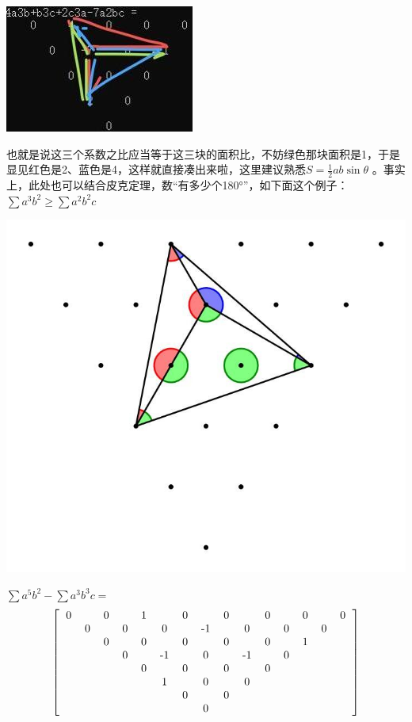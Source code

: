 \documentclass[UTF8]{ctexart}
\begin{document}
\begin{center}
	\includegraphics[width=0.4\linewidth]{130}
\end{center}

也就是说这三个系数之比应当等于这三块的面积比，不妨绿色那块面积是1，于是显见红色是2、蓝色是4，这样就直接凑出来啦，这里建议熟悉$ S=\displaystyle \frac{1}{2}ab  \sin \theta $
。事实上，此处也可以结合皮克定理，数“有多少个180°”，如下面这个例子：\\
$ \displaystyle  \sum a^{3} b^{2} \geq \displaystyle  \sum a^{2} b^{2} c $

\begin{center}
	\includegraphics[width=0.4\linewidth]{140}
\end{center}

$ \displaystyle  \sum a^{5}b^{2}-\displaystyle  \sum a^{3}b^{3}c= $
\renewcommand*{\arraystretch}{1.732}\[\left[\begin{matrix}
	\begin{tabular}{ccccccccccccccc}
		0& &0& &1& &0& &0& &0& &0& &0\\
		&0& &0& &0& &-1& &0& &0& &0&\\
		& &0& &0& &0& &0& &0& &1& &\\
		& & &0& &-1& &0& &-1& &0& & &\\
		& & & &0& &0& &0& &0& & & &\\
		& & & & &1& &0& &0& & & & &\\
		& & & & & &0& &0& & & & & &\\
		& & & & & & &0& & & & & & &\\
	\end{tabular}
\end{matrix}\right]\]
\end{document}
